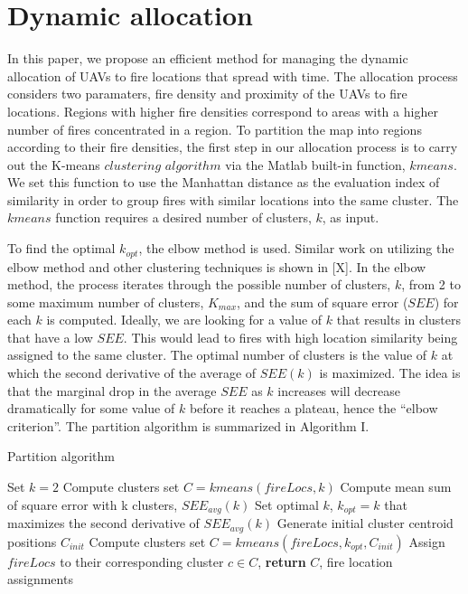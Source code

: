 \documentclass[a4paper, 11pt]{article}
\begin{document}
\section{Dynamic allocation}

In this paper, we propose an efficient method for managing the dynamic allocation of UAVs to fire locations that spread with time. The allocation process considers two paramaters, fire density and proximity of the UAVs to fire locations. Regions with higher fire densities correspond to areas with a higher number of fires concentrated in a region. To partition the map into regions according to their fire densities, the first step in our allocation process is to carry out the K-means $clustering$ $algorithm$ via the Matlab built-in function, $kmeans$. We set this function to use the Manhattan distance as the evaluation index of similarity in order to group fires with similar locations into the same cluster. The $kmeans$ function requires a desired number of clusters, $k$, as input. 

To find the optimal $k_{opt}$, the elbow method is used. Similar work on utilizing the elbow method and other clustering techniques is shown in [X]. In the elbow method, the process iterates through the possible number of clusters, $k$, from 2 to some maximum number of clusters, $K_{max}$, and the sum of square error ($SEE$) for each $k$ is computed. Ideally, we are looking for a value of $k$ that results in clusters that have a low $SEE$. This would lead to fires with high location similarity being assigned to the same cluster. The optimal number of clusters is the value of $k$ at which the second derivative of the average of $SEE(k)$ is maximized. The idea is that the marginal drop in the average $SEE$ as $k$ increases will decrease dramatically for some value of $k$ before it reaches a plateau, hence the ``elbow criterion''. The partition algorithm is summarized in Algorithm I.
\begin{algorithm}
  \caption{Partition algorithm}\label{alg:kMeans}
  \begin{algorithmic}[1]
      \State Set $k = 2$
        \State Compute clusters set $C = kmeans(fireLocs,k)$ 
        \State Compute mean sum of square error with k clusters, $SEE_{avg}(k)$
      \EndWhile
      \State Set optimal $k$, $k_{opt} = k$ that maximizes the second derivative of $SEE_{avg}(k)$
      \State Generate initial cluster centroid positions $C_{init}$
      \State Compute clusters set $C = kmeans(fireLocs,k_{opt},C_{init})$
      \State Assign $fireLocs$ to their corresponding cluster $c \in C$, 
      \State \textbf{return} $C$, fire location assignments
    \EndProcedure
  \end{algorithmic}
\end{algorithm}
 
\end{document}
